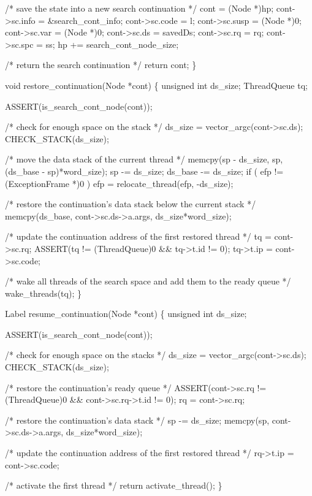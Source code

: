     /* save the state into a new search continuation */
    cont          = (Node *)hp;
    cont->sc.info = &search_cont_info;
    cont->sc.code = l;
    cont->sc.susp = (Node *)0;
    cont->sc.var  = (Node *)0;
    cont->sc.ds   = savedDs;
    cont->sc.rq   = rq;
    cont->sc.spc  = ss;
    hp           += search_cont_node_size;

    /* return the search continuation */
    return cont;
\}

void
restore_continuation(Node *cont)
\{
    unsigned int ds_size;
    ThreadQueue  tq;

    ASSERT(is_search_cont_node(cont));

    /* check for enough space on the stack */
    ds_size = vector_argc(cont->sc.ds);
    CHECK_STACK(ds_size);

    /* move the data stack of the current thread */
    memcpy(sp - ds_size, sp, (ds_base - sp)*word_size);
    sp      -= ds_size;
    ds_base -= ds_size;
    if ( efp != (ExceptionFrame *)0 )
        efp = relocate_thread(efp, -ds_size);

    /* restore the continuation's data stack below the current stack */
    memcpy(ds_base, cont->sc.ds->a.args, ds_size*word_size);

    /* update the continuation address of the first restored thread */
    tq = cont->sc.rq;
    ASSERT(tq != (ThreadQueue)0 && tq->t.id != 0);
    tq->t.ip = cont->sc.code;

    /* wake all threads of the search space and add them to the ready queue */
    wake_threads(tq);
\}

Label
resume_continuation(Node *cont)
\{
    unsigned int ds_size;

    ASSERT(is_search_cont_node(cont));

    /* check for enough space on the stacks */
    ds_size = vector_argc(cont->sc.ds);
    CHECK_STACK(ds_size);

    /* restore the continuation's ready queue */
    ASSERT(cont->sc.rq != (ThreadQueue)0 && cont->sc.rq->t.id != 0);
    rq = cont->sc.rq;

    /* restore the continuation's data stack */
    sp -= ds_size;
    memcpy(sp, cont->sc.ds->a.args, ds_size*word_size);

    /* update the continuation address of the first restored thread */
    rq->t.ip = cont->sc.code;

    /* activate the first thread */
    return activate_thread();
\}
\nwendcode{}

%
%


